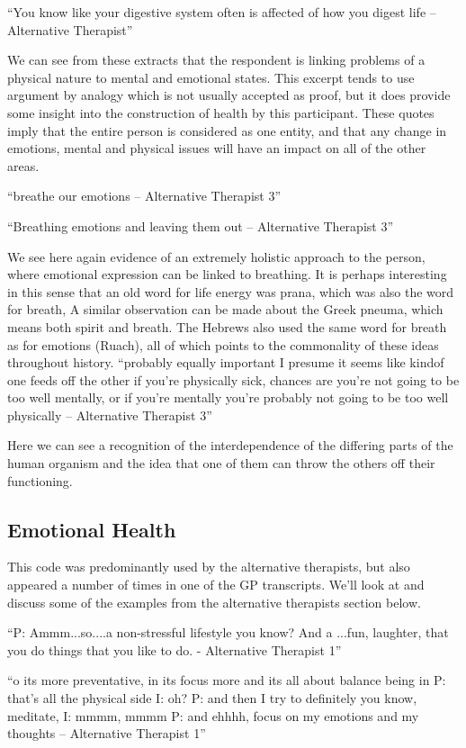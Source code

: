 ``You know like your digestive system often is affected of how you digest life – Alternative Therapist''


We can see from these extracts that the respondent is linking problems of a physical nature to mental and emotional states. This excerpt tends to use argument by analogy which is not usually accepted as proof, but it does provide some insight into the construction of health by this participant. These quotes imply that the entire person is considered as one entity, and that any change in emotions, mental and physical issues will have an impact on all of the other areas. 

``breathe our emotions – Alternative Therapist 3''

``Breathing emotions and leaving them out – Alternative Therapist 3''

We see here again evidence of an extremely holistic approach to the person, where emotional expression can be linked to breathing. It is perhaps interesting in this sense that an old word for life energy was prana, which was also the word for breath, A similar observation can be made about the Greek pneuma, which means both spirit and breath. The Hebrews also used the same word for breath as for emotions (Ruach), all of which points to the commonality of these ideas throughout history. 
``probably equally important I presume it seems like kindof one feeds off the other if you're physically sick, chances are you're not going to be too well mentally, or if you're mentally you're probably not going to be too well physically – Alternative Therapist 3''

Here we can see a recognition of the interdependence of the differing parts of the human organism and the idea that one of them can throw the others off their functioning. 

\subsection{Emotional Health}

This code was predominantly used by the alternative therapists, but also appeared a number of times in one of the GP transcripts. We'll look at and discuss some of the examples from the alternative therapists section below. 

``P: Ammm...so....a non-stressful lifestyle you know? And a ...fun, laughter, that you do things that you like to do. - Alternative Therapist 1''

``o its more preventative, in its focus more and its all about balance being in
P: that's all the physical side
I: oh?
P: and then I try to definitely you know, meditate, 
I: mmmm, mmmm
P: and ehhhh, focus on my emotions and my thoughts – Alternative Therapist 1''

